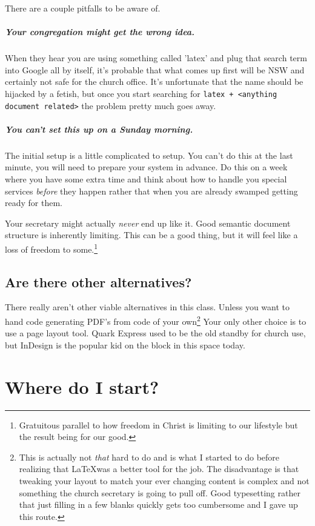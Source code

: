 \documentclass[12pt]{scrartcl}
\begin{document}
There are a couple pitfalls to be aware of.

\subparagraph{Your congregation might get the wrong idea.}

When they hear you are using something called 'latex' and plug that search term
into Google all by itself, it's probable that what comes up first will be NSW
and certainly not safe for the church office. It's unfortunate that the name
should be hijacked by a fetish, but once you start searching for \texttt{latex +
	<anything document related>} the problem pretty much goes away.

\subparagraph{You can't set this up on a Sunday morning.}

The initial setup is a little complicated to setup. You can't do this at the
last minute, you will need to prepare your system in advance. Do this on a week
where you have some extra time and think about how to handle you special
services \emph{before} they happen rather that when you are already swamped
getting ready for them.

Your secretary might actually \emph{never} end up like it. Good semantic
document structure is inherently limiting. This can be a good thing, but it will
feel like a loss of freedom to some.\footnote{Gratuitous parallel to how freedom
	in Christ is limiting to our lifestyle but the result being for our
	good.}

\subsection{Are there other alternatives?}

There really aren't other viable alternatives in this class. Unless you want to
hand code generating PDF's from code of your own\footnote{This is actually not
	\emph{that} hard to do and is what I started to do before realizing that
	\LaTeX was a better tool for the job. The disadvantage is that tweaking
	your layout to match your ever changing content is complex and not
	something the church secretary is going to pull off. Good typesetting
	rather that just filling in a few blanks quickly gets too cumbersome and
	I gave up this route.} Your only other choice is to use a page layout
tool. Quark Express used to be the old standby for church use, but InDesign is
the popular kid on the block in this space today.

\section{Where do I start?}
\end{document}
